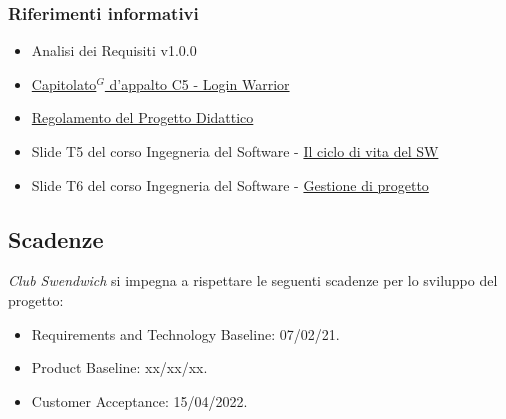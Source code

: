 \subsubsection{Riferimenti informativi}
\begin{itemize}
    \item Analisi dei Requisiti v1.0.0
    \item \href{https://www.math.unipd.it/~tullio/IS-1/2021/Progetto/C5.pdf}{Capitolato$^G$  d'appalto C5 - Login Warrior}
    \item \href{https://www.math.unipd.it/~tullio/IS-1/2021/Dispense/PD2.pdf}{Regolamento del Progetto Didattico}
    \item Slide T5 del corso Ingegneria del Software - \href{https://www.math.unipd.it/~tullio/IS-1/2021/Dispense/T05.pdf}{Il ciclo di vita del SW}
    \item Slide T6 del corso Ingegneria del Software - \href{https://www.math.unipd.it/~tullio/IS-1/2021/Dispense/T06.pdf}{Gestione di progetto}
\end{itemize}

\subsection{Scadenze}
\textit{Club Swendwich} si impegna a rispettare le seguenti scadenze per lo sviluppo del progetto:
\begin{itemize}
    \item Requirements and Technology Baseline: 07/02/21.
    \item Product Baseline: xx/xx/xx.
    \item Customer Acceptance: 15/04/2022.
\end{itemize}